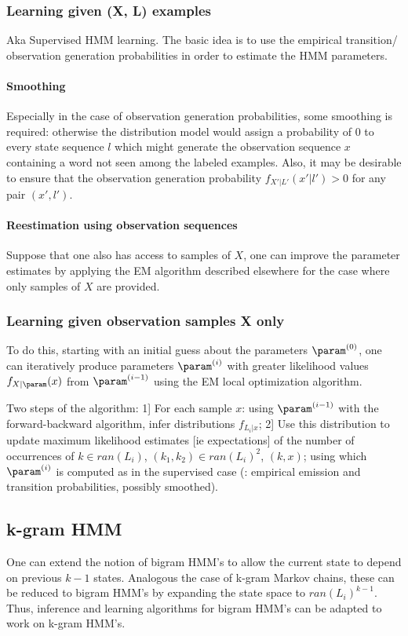 \documentclass[oneside, article]{memoir}
\begin{document}
\subsubsection{Learning given (X, L) examples}
Aka Supervised HMM learning. The basic idea is to use the empirical transition/ observation generation probabilities in order to estimate the HMM parameters.

\paragraph{Smoothing}
Especially in the case of observation generation probabilities, some smoothing is required: otherwise the distribution model would assign a probability of 0 to every state sequence $l$ which might generate the observation sequence $x$ containing a word not seen among the labeled examples. Also, it may be desirable to ensure that the observation generation probability $f_{X'|L'}(x'|l') > 0$ for any pair $(x', l')$.

\paragraph{Reestimation using observation sequences}
Suppose that one also has access to samples of $X$, one can improve the parameter estimates by applying the EM algorithm described elsewhere for the case where only samples of $X$ are provided.

\subsubsection{Learning given observation samples X only}
To do this, starting with an initial guess about the parameters $\param^{(0)}$, one can iteratively produce parameters $\param^{(i)}$ with greater likelihood values $f_{X|\param}(x)$ from $\param^{(i-1)}$ using the EM local optimization algorithm.

Two steps of the algorithm: 1] For each sample $x$: using $\param^{(i-1)}$ with the forward-backward algorithm, infer distributions $f_{L_i| x}$; 2] Use this distribution to update maximum likelihood estimates [ie expectations] of the number of occurrences of $k \in ran(L_i)$, $(k_1, k_2) \in ran(L_i)^2$, $(k, x)$; using which $\param^{(i)}$ is computed as in the supervised case (: empirical emission and transition probabilities, possibly smoothed).

\subsection{k-gram HMM}
One can extend the notion of bigram HMM's to allow the current state to depend on previous $k-1$ states. Analogous the case of k-gram Markov chains, these can be reduced to bigram HMM's by expanding the state space to $ran(L_i)^{k-1}$. Thus, inference and learning algorithms for bigram HMM's can be adapted to work on k-gram HMM's.
\end{document}
